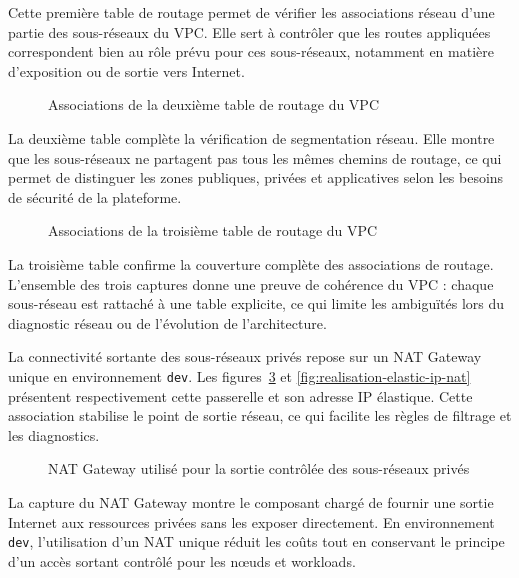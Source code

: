 Cette première table de routage permet de vérifier les associations réseau d'une partie des sous-réseaux du VPC. Elle sert à contrôler que les routes appliquées correspondent bien au rôle prévu pour ces sous-réseaux, notamment en matière d'exposition ou de sortie vers Internet.

\begin{figure}[H]
\centering
{}
\caption{Associations de la deuxième table de routage du VPC}
\label{fig:realisation-vpc-route-table-2}
\end{figure}

La deuxième table complète la vérification de segmentation réseau. Elle montre que les sous-réseaux ne partagent pas tous les mêmes chemins de routage, ce qui permet de distinguer les zones publiques, privées et applicatives selon les besoins de sécurité de la plateforme.

\begin{figure}[H]
\centering
{}
\caption{Associations de la troisième table de routage du VPC}
\label{fig:realisation-vpc-route-table-3}
\end{figure}

La troisième table confirme la couverture complète des associations de routage. L'ensemble des trois captures donne une preuve de cohérence du VPC : chaque sous-réseau est rattaché à une table explicite, ce qui limite les ambiguïtés lors du diagnostic réseau ou de l'évolution de l'architecture.

La connectivité sortante des sous-réseaux privés repose sur un NAT Gateway unique en environnement \texttt{dev}. Les figures~\ref{fig:realisation-nat-gateway} et \ref{fig:realisation-elastic-ip-nat} présentent respectivement cette passerelle et son adresse IP élastique. Cette association stabilise le point de sortie réseau, ce qui facilite les règles de filtrage et les diagnostics.

\begin{figure}[H]
\centering
{}
\caption{NAT Gateway utilisé pour la sortie contrôlée des sous-réseaux privés}
\label{fig:realisation-nat-gateway}
\end{figure}

La capture du NAT Gateway montre le composant chargé de fournir une sortie Internet aux ressources privées sans les exposer directement. En environnement \texttt{dev}, l'utilisation d'un NAT unique réduit les coûts tout en conservant le principe d'un accès sortant contrôlé pour les nœuds et workloads.

